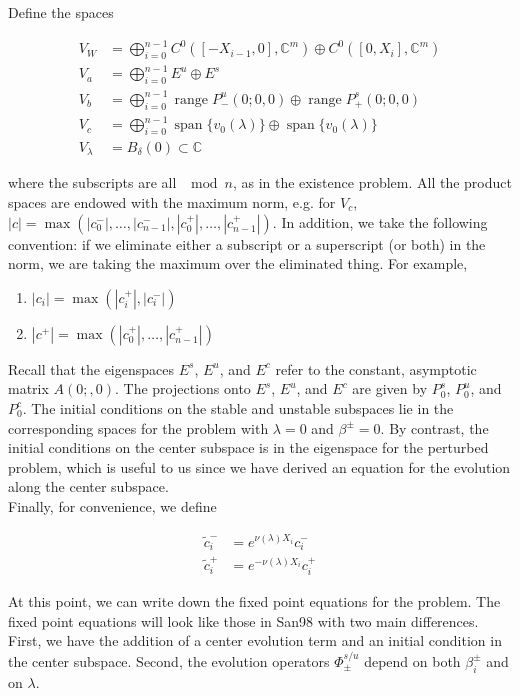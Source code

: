 \documentclass[12pt]{article}
\def\C{{\mathbb C}}
\DeclareMathOperator{\spn}{span}
\DeclareMathOperator{\ran}{range}
\begin{document}
Define the spaces

\begin{align*}
V_W &= \bigoplus_{i=0}^{n-1} C^0([-X_{i-1}, 0], \C^m) \oplus C^0([0, X_i], \C^m) \\
V_a &= \bigoplus_{i=0}^{n-1} E^u \oplus E^s\\
V_b &= \bigoplus_{i=0}^{n-1} \ran P^u_-(0; 0, 0) \oplus \ran P^s_+(0; 0, 0) \\
V_c &= \bigoplus_{i=0}^{n-1} \spn \{v_0(\lambda)\} \oplus \spn \{v_0(\lambda)\} \\
V_\lambda &= B_\delta(0) \subset \C
\end{align*}

where the subscripts are all $\mod n$, as in the existence problem. All the product spaces are endowed with the maximum norm, e.g. for $V_c$, $|c| = \max(|c_0^-|, \dots, |c_{n-1}^-|, |c_0^+|, \dots, |c_{n-1}^+|)$. In addition, we take the following convention: if we eliminate either a subscript or a superscript (or both) in the norm, we are taking the maximum over the eliminated thing. For example,
\begin{enumerate}
	\item $|c_i| = \max(|c_i^+|, |c_i^-|)$ 
	\item $|c^+| = \max(|c_0^+|, \dots, |c_{n-1}^+|)$
\end{enumerate} 

Recall that the eigenspaces $E^s$, $E^u$, and $E^c$ refer to the constant, asymptotic matrix $A(0;, 0)$. The projections onto $E^s$, $E^u$, and $E^c$ are given by $P_0^s$, $P_0^u$, and $P_0^c$. The initial conditions on the stable and unstable subspaces lie in the corresponding spaces for the problem with $\lambda = 0$ and $\beta^\pm = 0$. By contrast, the initial conditions on the center subspace is in the eigenspace for the perturbed problem, which is useful to us since we have derived an equation for the evolution along the center subspace.\\

Finally, for convenience, we define

\begin{align*}
\tilde{c}_i^- &= e^{\nu(\lambda)X_i} c_i^- \\
\tilde{c}_i^+ &= e^{-\nu(\lambda)X_i} c_i^+
\end{align*}

At this point, we can write down the fixed point equations for the problem. The fixed point equations will look like those in San98 with two main differences. First, we have the addition of a center evolution term and an initial condition in the center subspace. Second, the evolution operators $\Phi^{s/u}_\pm$ depend on both $\beta_i^\pm$ and on $\lambda$.\\
\end{document}
